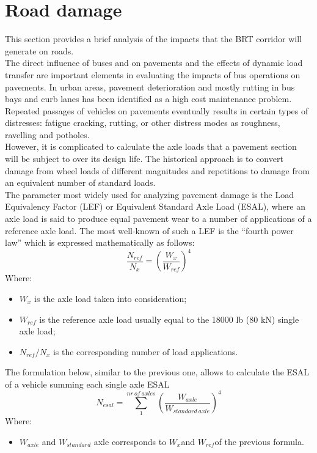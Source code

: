 \documentclass{article}
\begin{document}
\section{Road damage} %
This section provides a brief analysis of the impacts that the BRT corridor will generate on roads.\\ 
The direct influence of buses and on pavements and the effects of dynamic load transfer are important elements in evaluating the impacts of bus operations on pavements. In urban areas, pavement deterioration and mostly rutting in bus bays and curb lanes has been identified as a high cost maintenance problem. Repeated passages of vehicles on pavements eventually results in certain types of distresses: fatigue cracking, rutting, or other distress modes as roughness, ravelling and potholes.\\
However, it is complicated to calculate the axle loads that a pavement section will be subject to over its design life. The historical approach is to convert damage from wheel loads of different magnitudes and repetitions to damage from an equivalent number of standard loads.\\
The parameter most widely used for analyzing pavement damage is the Load Equivalency Factor (LEF) or Equivalent Standard Axle Load (ESAL), where an axle load is said to produce equal pavement wear to a number of applications of a reference axle load. The most well-known of such a LEF is the “fourth power law” which is expressed mathematically as follows: 
\begin{equation}
\frac{N_{ref}}{N_{x}}=\left(\frac{W_x}{W_{ref}}\right)^4
\end{equation}
Where:
\begin{itemize}
\item $W_x$ is the axle load taken into consideration;
\item $W_{ref}$ is the reference axle load usually equal to the 18000 lb (80 kN) single axle load;
\item $N_{ref}/N_{x}$ is the corresponding number of load applications. 
\end{itemize}
The formulation below, similar to the previous one, allows to calculate the ESAL of a vehicle summing each single axle ESAL
\begin{equation}
N_{esal}=\sum_{1}^{nr\:of\:axles}\left(\frac{W_{axle}}{W_{standard\:axle}}\right)^4
\end{equation}
Where:
\begin{itemize}
\item$W_{axle}$ and $W_{standard}$ axle corresponds to $W_x $and $W_{ref} $of the previous formula.
\end{itemize}
\end{document}
